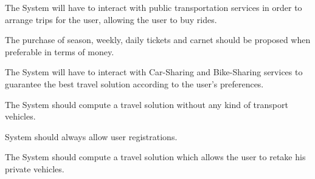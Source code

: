 \begin{goalList}
\item \label{goal:buyTicket}The System will have to interact with public transportation services in order to arrange trips for the user, allowing the user to buy rides.

\begin{enumerate}[label={[}G 5.\arabic*{]}]
\item \label{goal:purchase} The purchase of season, weekly, daily tickets and carnet should be proposed when preferable in terms of money.  

\end{enumerate}

\item \label{goal:sharing}The System will have to interact with Car-Sharing and Bike-Sharing services to guarantee the best travel solution according to the user's preferences.

\item \label{goal:piotti}The System should compute a travel solution without any kind of transport vehicles.

\item \label{goal:login} System should always allow user registrations.

\item \label{goal:retakeCar}The System should compute a travel solution which allows the user to retake his private vehicles.

\end{goalList}

